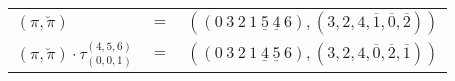 \begin{example}\label{example:LRYMWOFK}
  \hfill \break
  \begin{tabular}{lll}
    $(\pi,\breve\pi)$ & $=$ & $(({0}~{3}~{2}~{1}~\underline{{5}}~\underline{{4}}~{6}),(3,2,4,\overline{1},\overline{0},\overline{2}))$ \\
    $(\pi,\breve\pi) \cdot \tau^{(4,5,6)}_{(0,0,1)}$ & $=$ & $(({0}~{3}~{2}~{1}~\underline{{4}}~\underline{{5}}~{6}),(3,2,4,\overline{0},\overline{2},\overline{1}))$ \\
  \end{tabular}
\end{example}